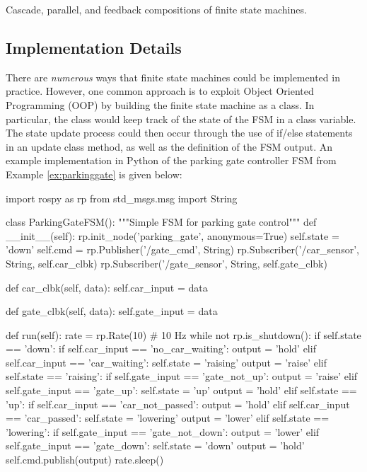 \begin{example}
\begin{marginfigure}
    \caption{Cascade, parallel, and feedback compositions of finite state machines.}
    \label{fig:cascade}
\end{marginfigure}



\subsection{Implementation Details}
There are \textit{numerous} ways that finite state machines could be implemented in practice. However, one common approach is to exploit Object Oriented Programming (OOP) by building the finite state machine as a class. In particular, the class would keep track of the state of the FSM in a class variable. The state update process could then occur through the use of if/else statements in an update class method, as well as the definition of the FSM output. An example implementation in Python of the parking gate controller FSM from Example \ref{ex:parkinggate} is given below:
\begin{python}
import rospy as rp
from std_msgs.msg import String

class ParkingGateFSM():
    """Simple FSM for parking gate control"""
    def __init__(self):
        rp.init_node('parking_gate', anonymous=True)
        self.state = 'down'
        self.cmd = rp.Publisher('/gate_cmd', String)
        rp.Subscriber('/car_sensor', String, self.car_clbk)
        rp.Subscriber('/gate_sensor', String, self.gate_clbk)

    def car_clbk(self, data):
        self.car_input = data

    def gate_clbk(self, data):
        self.gate_input = data

    def run(self):
        rate = rp.Rate(10) # 10 Hz
        while not rp.is_shutdown():
            if self.state == 'down':
                if self.car_input == 'no_car_waiting':
                    output = 'hold'
                elif self.car_input == 'car_waiting':
                    self.state = 'raising'
                    output = 'raise'
            elif self.state == 'raising':
                if self.gate_input == 'gate_not_up':
                    output = 'raise'
                elif self.gate_input == 'gate_up':
                    self.state = 'up'
                    output = 'hold'
            elif self.state == 'up':
                if self.car_input == 'car_not_passed':
                    output = 'hold'
                elif self.car_input == 'car_passed':
                    self.state = 'lowering'
                    output = 'lower'
            elif self.state == 'lowering':
                if self.gate_input == 'gate_not_down':
                    output = 'lower'
                elif self.gate_input == 'gate_down':
                    self.state = 'down'
                    output = 'hold'
            self.cmd.publish(output)
            rate.sleep()
\end{python}


\end{example}
